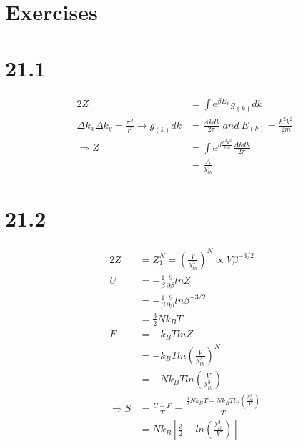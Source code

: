 \begin{latin}
    \section*{Exercises}
    \section*{21.1}
    \begin{alignat*}{2}
        Z &= \int e^{\beta E_{\aleph} }g_{(k)}dk\\
        \Delta k_x \Delta k_y = \frac{\pi ^2}{l^2} \to g_{(k)}dk &= \frac{Akdk}{2\pi} \ and \ E_{(k)} = \frac{\hbar^2 k^2}{2m}\\
        \Longrightarrow Z &= \int e^{\beta \frac{\hbar^2 k^2}{2m} }\frac{Akdk}{2\pi}\\
        &= \frac{A}{\lambda_{th}^2}
    \end{alignat*}
    \section*{21.2}
    \begin{alignat*}{2}
        Z &= Z_1^N = (\frac{V}{\lambda_{th}^3})^N \propto V\beta^{-3/2}\\
        U &=  -\frac{1}{\beta}\frac{\partial}{\partial \beta}ln Z \\
        &=  -\frac{1}{\beta}\frac{\partial}{\partial \beta}ln \beta^{-3/2} \\
        &= \frac{3}{2}Nk_B T\\
        F &= -k_B T lnZ \\
        &=-k_B T ln(\frac{V}{\lambda_{th}^3})^N\\
        &= -Nk_B T ln(\frac{V}{\lambda_{th}^3})\\
        \Longrightarrow S&= \frac{U - F}{T}= \frac{\frac{3}{2}Nk_B T-Nk_B T ln(\frac{\lambda_{th}^3}{V})}{T}\\
        &= Nk_B[\frac{3}{2} - ln(\frac{\lambda_{th}^3}{V})]
    \end{alignat*}


\end{latin}
